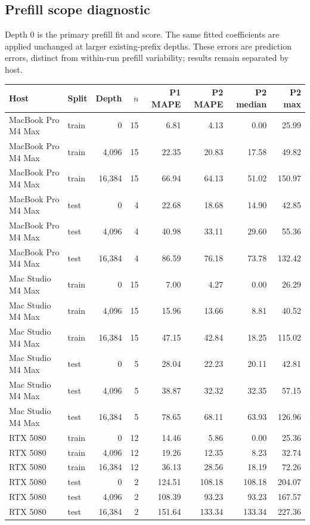 \documentclass[10pt]{article}
\begin{document}
\subsection{Prefill scope diagnostic}
Depth 0 is the primary prefill fit and score. The same fitted coefficients are applied unchanged at larger existing-prefix depths. These errors are prediction errors, distinct from within-run prefill variability; results remain separated by host.
\begin{center}
\small
\begin{tabular}{llrrrrrr}
\toprule
Host & Split & Depth & $n$ & P1 MAPE & P2 MAPE & P2 median & P2 max\\
\midrule
MacBook Pro M4 Max & train & 0 & 15 & 6.81 & 4.13 & 0.00 & 25.99 \\
MacBook Pro M4 Max & train & 4,096 & 15 & 22.35 & 20.83 & 17.58 & 49.82 \\
MacBook Pro M4 Max & train & 16,384 & 15 & 66.94 & 64.13 & 51.02 & 150.97 \\
MacBook Pro M4 Max & test & 0 & 4 & 22.68 & 18.68 & 14.90 & 42.85 \\
MacBook Pro M4 Max & test & 4,096 & 4 & 40.98 & 33.11 & 29.60 & 55.36 \\
MacBook Pro M4 Max & test & 16,384 & 4 & 86.59 & 76.18 & 73.78 & 132.42 \\
Mac Studio M4 Max & train & 0 & 15 & 7.00 & 4.27 & 0.00 & 26.29 \\
Mac Studio M4 Max & train & 4,096 & 15 & 15.96 & 13.66 & 8.81 & 40.52 \\
Mac Studio M4 Max & train & 16,384 & 15 & 47.15 & 42.84 & 18.25 & 115.02 \\
Mac Studio M4 Max & test & 0 & 5 & 28.04 & 22.23 & 20.11 & 42.81 \\
Mac Studio M4 Max & test & 4,096 & 5 & 38.87 & 32.32 & 32.35 & 57.15 \\
Mac Studio M4 Max & test & 16,384 & 5 & 78.65 & 68.11 & 63.93 & 126.96 \\
RTX 5080 & train & 0 & 12 & 14.46 & 5.86 & 0.00 & 25.36 \\
RTX 5080 & train & 4,096 & 12 & 19.26 & 12.35 & 8.23 & 32.74 \\
RTX 5080 & train & 16,384 & 12 & 36.13 & 28.56 & 18.19 & 72.26 \\
RTX 5080 & test & 0 & 2 & 124.51 & 108.18 & 108.18 & 204.07 \\
RTX 5080 & test & 4,096 & 2 & 108.39 & 93.23 & 93.23 & 167.57 \\
RTX 5080 & test & 16,384 & 2 & 151.64 & 133.34 & 133.34 & 227.36 \\
\bottomrule
\end{tabular}
\end{center}
\end{document}
